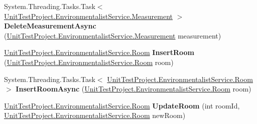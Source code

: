 \begin{DoxyCompactItemize}
\item 
\hypertarget{interface_unit_test_project_1_1_environmentalist_service_1_1_i_service1_a5ed0b19f64f0ec61ce675807b5773c9a}{}System.\+Threading.\+Tasks.\+Task$<$ \hyperlink{class_unit_test_project_1_1_environmentalist_service_1_1_measurement}{Unit\+Test\+Project.\+Environmentalist\+Service.\+Measurement} $>$ {\bfseries Delete\+Measurement\+Async} (\hyperlink{class_unit_test_project_1_1_environmentalist_service_1_1_measurement}{Unit\+Test\+Project.\+Environmentalist\+Service.\+Measurement} measurement)\label{interface_unit_test_project_1_1_environmentalist_service_1_1_i_service1_a5ed0b19f64f0ec61ce675807b5773c9a}

\item 
\hypertarget{interface_unit_test_project_1_1_environmentalist_service_1_1_i_service1_a2ee031484264c805459179b28fd1043d}{}\hyperlink{class_unit_test_project_1_1_environmentalist_service_1_1_room}{Unit\+Test\+Project.\+Environmentalist\+Service.\+Room} {\bfseries Insert\+Room} (\hyperlink{class_unit_test_project_1_1_environmentalist_service_1_1_room}{Unit\+Test\+Project.\+Environmentalist\+Service.\+Room} room)\label{interface_unit_test_project_1_1_environmentalist_service_1_1_i_service1_a2ee031484264c805459179b28fd1043d}

\item 
\hypertarget{interface_unit_test_project_1_1_environmentalist_service_1_1_i_service1_a4481641e74c9fccaeee3b79330aa9aa0}{}System.\+Threading.\+Tasks.\+Task$<$ \hyperlink{class_unit_test_project_1_1_environmentalist_service_1_1_room}{Unit\+Test\+Project.\+Environmentalist\+Service.\+Room} $>$ {\bfseries Insert\+Room\+Async} (\hyperlink{class_unit_test_project_1_1_environmentalist_service_1_1_room}{Unit\+Test\+Project.\+Environmentalist\+Service.\+Room} room)\label{interface_unit_test_project_1_1_environmentalist_service_1_1_i_service1_a4481641e74c9fccaeee3b79330aa9aa0}

\item 
\hypertarget{interface_unit_test_project_1_1_environmentalist_service_1_1_i_service1_aa508740d170b69c2c03bffbd8f1b5285}{}\hyperlink{class_unit_test_project_1_1_environmentalist_service_1_1_room}{Unit\+Test\+Project.\+Environmentalist\+Service.\+Room} {\bfseries Update\+Room} (int room\+Id, \hyperlink{class_unit_test_project_1_1_environmentalist_service_1_1_room}{Unit\+Test\+Project.\+Environmentalist\+Service.\+Room} new\+Room)\label{interface_unit_test_project_1_1_environmentalist_service_1_1_i_service1_aa508740d170b69c2c03bffbd8f1b5285}


\end{DoxyCompactItemize}
